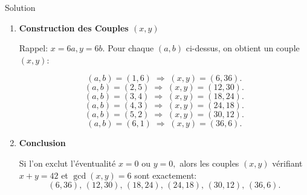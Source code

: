 \documentclass[a4paper,12pt]{article}
\begin{document}
\begin{solutionbox}{Solution}
\begin{enumerate}
      \item \textbf{Construction des Couples $(x,y)$}
    
      Rappel: $x=6a,y=6b.$  
      Pour chaque $(a,b)$ ci-dessus, on obtient un couple $(x,y)$:
    
      \[
      (a,b)=(1,6) \;\Longrightarrow\; (x,y)=(6,36).
      \]
      \[
      (a,b)=(2,5) \;\Longrightarrow\; (x,y)=(12,30).
      \]
      \[
      (a,b)=(3,4) \;\Longrightarrow\; (x,y)=(18,24).
      \]
      \[
      (a,b)=(4,3) \;\Longrightarrow\; (x,y)=(24,18).
      \]
      \[
      (a,b)=(5,2) \;\Longrightarrow\; (x,y)=(30,12).
      \]
      \[
      (a,b)=(6,1) \;\Longrightarrow\; (x,y)=(36,6).
      \]
    
      \item \textbf{Conclusion}
    
      Si l'on exclut l'éventualité $x=0$ ou $y=0,$ alors les couples $(x,y)$ vérifiant $x+y=42$ et $\gcd(x,y)=6$ sont exactement:
      \[
      \boxed{(6,36),\,(12,30),\,(18,24),\,(24,18),\,(30,12),\,(36,6)}.
      \]
    \end{enumerate}
    \end{solutionbox}
\end{document}
